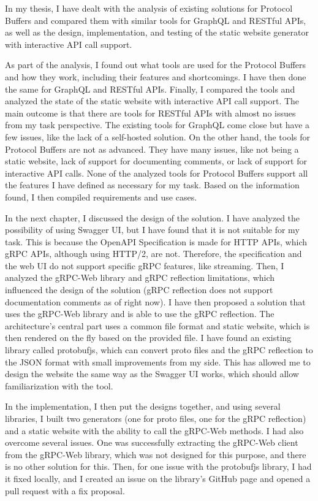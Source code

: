 In my thesis, I have dealt with the analysis of existing solutions for Protocol Buffers and compared them with similar tools for GraphQL and RESTful APIs, as well as the design, implementation, and testing of the static website generator with interactive API call support.

As part of the analysis, I found out what tools are used for the Protocol Buffers and how they work, including their features and shortcomings.
I have then done the same for GraphQL and RESTful APIs.
Finally, I compared the tools and analyzed the state of the static website with interactive API call support.
The main outcome is that there are tools for RESTful APIs with almost no issues from my task perspective.
The existing tools for GraphQL come close but have a few issues, like the lack of a self-hosted solution.
On the other hand, the tools for Protocol Buffers are not as advanced.
They have many issues, like not being a static website, lack of support for documenting comments, or lack of support for interactive API calls.
None of the analyzed tools for Protocol Buffers support all the features I have defined as necessary for my task.
Based on the information found, I then compiled requirements and use cases.

In the next chapter, I discussed the design of the solution.
I have analyzed the possibility of using Swagger UI, but I have found that it is not suitable for my task.
This is because the OpenAPI Specification is made for HTTP APIs, which gRPC APIs, although using HTTP/2, are not.
Therefore, the specification and the web UI do not support specific gRPC features, like streaming.
Then, I analyzed the gRPC-Web library and gRPC reflection limitations, which influenced the design of the solution (gRPC reflection does not support documentation comments as of right now).
I have then proposed a solution that uses the gRPC-Web library and is able to use the gRPC reflection.
The architecture's central part uses a common file format and static website, which is then rendered on the fly based on the provided file.
I have found an existing library called protobufjs, which can convert proto files and the gRPC reflection to the JSON format with small improvements from my side.
This has allowed me to design the website the same way as the Swagger UI works, which should allow familiarization with the tool.

In the implementation, I then put the designs together, and using several libraries, I built two generators (one for proto files, one for the gRPC reflection) and a static website with the ability to call the gRPC-Web methods.
I had also overcome several issues.
One was successfully extracting the gRPC-Web client from the gRPC-Web library, which was not designed for this purpose, and there is no other solution for this.
Then, for one issue with the protobufjs library, I had it fixed locally, and I created an issue on the library's GitHub page and opened a pull request with a fix proposal.

